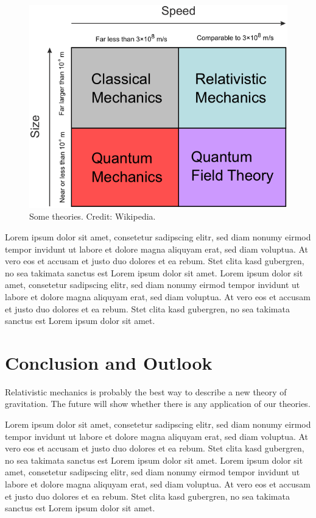 \documentclass[A4paper,]{article}
\begin{document}
\begin{figure}
\centering
\includegraphics{../fig/theories.png}
\caption{Some theories. Credit: Wikipedia.}\label{fig:theories}
\end{figure}

Lorem ipsum dolor sit amet, consetetur sadipscing elitr, sed diam nonumy eirmod tempor invidunt ut labore et dolore magna aliquyam erat, sed diam voluptua. At vero eos et accusam et justo duo dolores et ea rebum. Stet clita kasd gubergren, no sea takimata sanctus est Lorem ipsum dolor sit amet. Lorem ipsum dolor sit amet, consetetur sadipscing elitr, sed diam nonumy eirmod tempor invidunt ut labore et dolore magna aliquyam erat, sed diam voluptua. At vero eos et accusam et justo duo dolores et ea rebum. Stet clita kasd gubergren, no sea takimata sanctus est Lorem ipsum dolor sit amet.

\section{Conclusion and Outlook}\label{conclusion-and-outlook}

Relativistic mechanics is probably the best way to describe a new theory of gravitation.
The future will show whether there is any application of our theories.

Lorem ipsum dolor sit amet, consetetur sadipscing elitr, sed diam nonumy eirmod tempor invidunt ut labore et dolore magna aliquyam erat, sed diam voluptua. At vero eos et accusam et justo duo dolores et ea rebum. Stet clita kasd gubergren, no sea takimata sanctus est Lorem ipsum dolor sit amet. Lorem ipsum dolor sit amet, consetetur sadipscing elitr, sed diam nonumy eirmod tempor invidunt ut labore et dolore magna aliquyam erat, sed diam voluptua. At vero eos et accusam et justo duo dolores et ea rebum. Stet clita kasd gubergren, no sea takimata sanctus est Lorem ipsum dolor sit amet.
\appendix
\end{document}

